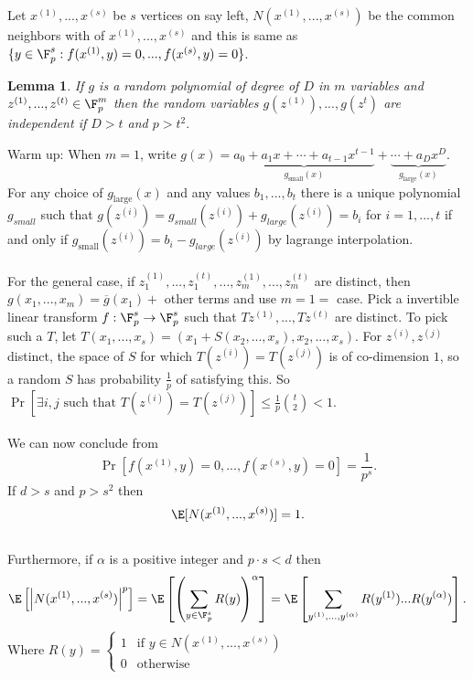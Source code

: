 \documentclass[a4paper]{article}
\newtheorem{lem}[thm]{Lemma}
\begin{document}
    \noindent Let $x^{(1)},...,x^{(s)}$ be $s$ vertices on say left, $N(x^{(1)},...,x^{(s)})$ be the common neighbors with of $x^{(1)},...,x^{(s)}$ and this is same as $ \{y\in \F_p^s: f(x^{(1)},y)=0,...,f(x^{(s)},y)=0\}$.
    \begin{lem}
        If $g$ is a random polynomial of degree of $D$ in $m$ variables and $z^{(1)},...,z^{(t)}\in \F_p^m$ then the random variables $g(z^{(1)}),...,g(z^{t})$ are independent if $D>t$ and $p>t^2.$
    \end{lem}
    \noindent Warm up: When $m=1$, write $g(x)=\underbrace{a_0+a_1x+\cdots+a_{t-1}x^{t-1}}_{g_\text{small}(x)}+\underbrace{\cdots+a_Dx^D}_{g_\text{large}(x)}$. \\
    For any choice of $g_\text{large}(x)$ and any values $b_1,...,b_t$ there is a unique polynomial $g_{small}$ such that $g(z^{(i)})=g_{small}(z^{(i)})+g_{large}(z^{(i)})=b_i$ for $i=1,...,t$ if and only if $g_\text{small}(z^{(i)})=b_i-g_{large}(z^{(i)})$ by lagrange interpolation.\\\\
    For the general case, if $z_1^{(1)},...,z_1^{(t)},...,z_m^{(1)},...,z_m^{(t)}$ are distinct, then $g(x_1,...,x_m)=\overline{g}(x_1)+$ other terms and use $m=1=$ case. Pick a invertible linear transform $f:\F_p^s\to \F_p^s$ such that $Tz^{(1)},...,Tz^{(t)}$ are distinct. To pick such a $T$, let $T(x_1,...,x_s)=(x_1+S(x_2,...,x_s),x_2,...,x_s)$. For $z^{(i)},z^{(j)}$ distinct, the space of $S$ for which $T(z^{(i)})= T(z^{(j)})$ is of co-dimension $1$, so a random $S$ has probability $\frac{1}{p}$ of satisfying this. So $\Pr[\exists i,j \text{ such that } T(z^{(i)})= T(z^{(j)})]\leq\frac{1}{p}{t \choose 2}<1$.\\\\
    We can now conclude from \[
    \Pr[f(x^{(1)},y)=0,...,f(x^{(s)},y)=0]= \frac{1}{p^s}
    .\] 
    If $d>s$ and $p>s^2$ then \[
    \E[N(x^{(1)},...,x^{(s)})]=1
    .\] \\
    Furthermore, if $\alpha$ is a positive integer and $p \cdot s<d$ then \[
    \E\left [\left |N(x^{(1)},...,x^{(s)}) \right |^p \right] =\E \left [ \left( \sum_{y\in \F_p^s}R(y) \right)^\alpha \right ]=\E \left [\sum_{y^{(1)},...,y^{(\alpha)}} R(y^{(1)})...R(y^{(\alpha)}) \right ]
    .\] 
    Where $R(y)= \begin{cases}
        1 & \text{if } y\in N(x^{(1)},...,x^{(s)})\\
        0 & \text{otherwise}
    \end{cases}$\\
\end{document}

